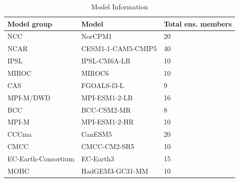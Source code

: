 \documentclass{article}
\begin{document}
\begin{table}[ht]
    \centering
    \caption{Model Information}
    \begin{tabular}{lll}
        \toprule
        Model group & Model & Total ens. members \\
        \midrule
        NCC & NorCPM1 & 20 \\
        NCAR & CESM1-1-CAM5-CMIP5 & 40 \\
        IPSL & IPSL-CM6A-LR & 10 \\
        MIROC & MIROC6 & 10 \\
        CAS & FGOALS-f3-L & 9 \\
        MPI-M/DWD & MPI-ESM1-2-LR & 16 \\
        BCC & BCC-CSM2-MR & 8 \\
        MPI-M & MPI-ESM1-2-HR & 10 \\
        CCCma & CanESM5 & 20 \\
        CMCC & CMCC-CM2-SR5 & 10 \\
        EC-Earth-Consortium & EC-Earth3 & 15 \\
        MOHC & HadGEM3-GC31-MM & 10 \\
        \bottomrule
    \end{tabular}
    \label{tab:models}
\end{table}


\end{document}
